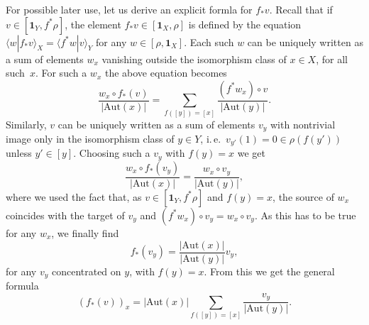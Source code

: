 \documentclass[12pt]{scrartcl}
\theoremstyle{definition}
\numberwithin{equation}{section}
\numberwithin{definition}{section}
\numberwithin{figure}{section}
\begin{document}
For possible later use, let us derive an explicit formla for $f_*v$. Recall that  if $v\in [\mathbf{1}_Y,f^*\rho]$, the element $f_*v\in [\mathbf{1}_X,\rho]$ is defined 
 by the equation $
\langle w| f_*v\rangle_X = \langle f^*w| v\rangle_Y$
for any $w\in [\rho,\mathbf{1}_X]$. Each such $w$ can be uniquely written as a sum of elements $w_x$ vanishing outside the isomorphism class of $x \in X$, for all such~$x$. For such a $w_x$ the above equation becomes
\[
\frac{w_x\circ f_*(v)}{|\mathrm{Aut}(x)|} = \sum_{f([y])=[x]}\frac{(f^*w_x)\circ v} {|\mathrm{Aut}(y)|}.
\]
	Similarly, $v$ can be uniquely written as a sum of elements $v_y$ with nontrivial image only in the isomorphism class of $y \in Y$, i.\,e.\ $v_{y'}(1) = 0 \in \rho(f(y'))$ unless $y' \in [y]$. 
Choosing such a $v_y$ with $f(y)=x$ we get
\[
\frac{w_x\circ f_*(v_y)}{|\mathrm{Aut}(x)|} = \frac{w_x\circ v_y} {|\mathrm{Aut}(y)|},
\]
where we used the fact that, as $v\in [\mathbf{1}_Y,f^*\rho]$ and $f(y)=x$, the source of $w_x$ coincides with the target of $v_y$ and $(f^*w_x)\circ v_y=w_x\circ v_y$. As this has to be true for any $w_x$, we finally find
\[
f_*(v_y)= \frac{|\mathrm{Aut}(x)| } {|\mathrm{Aut}(y)|}v_y,
\]
for any $v_y$ concentrated on $y$, with $f(y)=x$. From this we get the general formula
\[
(f_*(v))_x=|\mathrm{Aut}(x)|\sum_{f([y])=[x]}\frac{v_y}{|\mathrm{Aut}(y)|}.
\]
\end{document}
